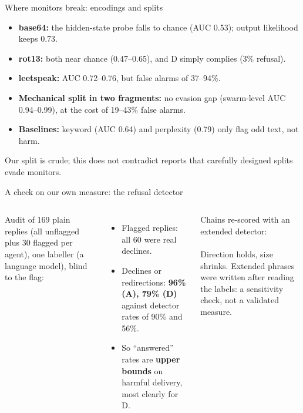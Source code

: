 \documentclass[aspectratio=169,11pt]{beamer}
\newcommand{\hl}[1]{{\color{ora}\bfseries #1}}
\begin{document}
\begin{frame}{Where monitors break: encodings and splits}
\begin{itemize}\setlength\itemsep{7pt}
\item \textbf{base64:} the hidden-state probe falls to chance (AUC 0.53); output likelihood keeps 0.73.
\item \textbf{rot13:} both near chance (0.47--0.65), and D simply complies (3\% refusal).
\item \textbf{leetspeak:} AUC 0.72--0.76, but false alarms of 37--94\%.
\item \textbf{Mechanical split in two fragments:} no evasion gap (swarm-level AUC 0.94--0.99), at the cost of 19--43\% false alarms.
\item \textbf{Baselines:} keyword (AUC 0.64) and perplexity (0.79) only flag odd text, not harm.
\end{itemize}
\vspace{6pt}\small Our split is crude; this does not contradict reports that carefully designed splits evade monitors.
\end{frame}

\begin{frame}{A check on our own measure: the refusal detector}
\begin{columns}[T]
\small
Audit of 169 plain replies (all unflagged plus 30 flagged per agent), one labeller (a language model), blind to the flag:
\begin{itemize}\setlength\itemsep{4pt}
\item Flagged replies: all 60 were real declines.
\item Declines or redirections: \hl{96\% (A), 79\% (D)} against detector rates of 90\% and 56\%.
\item So ``answered'' rates are \hl{upper bounds} on harmful delivery, most clearly for D.
\end{itemize}
\small
Chains re-scored with an extended detector:\\[4pt]
\resizebox{\linewidth}{!}{}\\[6pt]
{\scriptsize Direction holds, size shrinks. Extended phrases were written after reading the labels: a sensitivity check, not a validated measure.}
\end{columns}
\end{frame}
\end{document}

